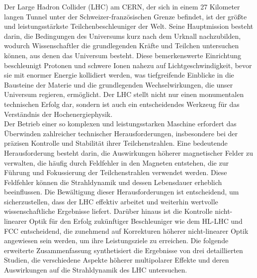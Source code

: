 {
\fontsize{\fontsizesummary}{\fontskipsummary}\selectfont

Der Large Hadron Collider (LHC) am CERN, der sich in einem 27 Kilometer langen Tunnel unter der
Schweizer-französischen Grenze befindet, ist der größte und leistungsstärkste Teilchenbeschleuniger
der Welt. Seine Hauptmission besteht darin, die Bedingungen des Universums kurz nach dem Urknall
nachzubilden, wodurch Wissenschaftler die grundlegenden Kräfte und Teilchen untersuchen können, aus
denen das Universum besteht. Diese bemerkenswerte Einrichtung beschleunigt Protonen und schwere
Ionen nahezu auf Lichtgeschwindigkeit, bevor sie mit enormer Energie kollidiert werden, was
tiefgreifende Einblicke in die Bausteine der Materie und die grundlegenden Wechselwirkungen, die
unser Universum regieren, ermöglicht. Der LHC stellt nicht nur einen monumentalen technischen Erfolg
dar, sondern ist auch ein entscheidendes Werkzeug für das Verständnis der Hochenergiephysik.
\\
\indent
Der Betrieb einer so komplexen und leistungsstarken Maschine erfordert das Überwinden zahlreicher
technischer Herausforderungen, insbesondere bei der präzisen Kontrolle und Stabilität ihrer
Teilchenstrahlen. Eine bedeutende Herausforderung besteht darin, die Auswirkungen höherer
magnetischer Felder zu verwalten, die häufig durch Feldfehler in den Magneten entstehen, die zur
Führung und Fokussierung der Teilchenstrahlen verwendet werden. Diese Feldfehler können die
Strahldynamik und dessen Lebensdauer erheblich beeinflussen. Die Bewältigung dieser
Herausforderungen ist entscheidend, um sicherzustellen, dass der LHC effektiv arbeitet und weiterhin
wertvolle wissenschaftliche Ergebnisse liefert. Darüber hinaus ist die Kontrolle nicht-linearer
Optik für den Erfolg zukünftiger Beschleuniger wie dem HL-LHC und FCC entscheidend, die zunehmend
auf Korrekturen höherer nicht-linearer Optik angewiesen sein werden, um ihre Leistungsziele zu
erreichen. Die folgende erweiterte Zusammenfassung synthetisiert die Ergebnisse von drei
detaillierten Studien, die verschiedene Aspekte höherer multipolarer Effekte und deren Auswirkungen
auf die Strahldynamik des LHC untersuchen.

}
